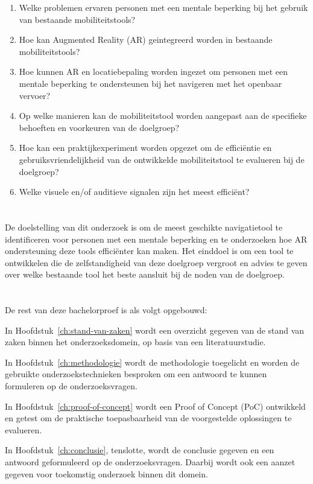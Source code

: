 \begin{enumerate}
    \item Welke problemen ervaren personen met een mentale beperking bij het gebruik van bestaande mobiliteitstools?
    \item Hoe kan Augmented Reality (AR) geintegreerd worden in bestaande mobiliteitstools?
    \item Hoe kunnen AR en locatiebepaling worden ingezet om personen met een mentale beperking te ondersteunen bij het navigeren met het openbaar vervoer?
    \item Op welke manieren kan de mobiliteitstool worden aangepast aan de specifieke behoeften en voorkeuren van de doelgroep?
    \item Hoe kan een praktijkexperiment worden opgezet om de efficiëntie en gebruiksvriendelijkheid van de ontwikkelde mobiliteitstool te evalueren bij de doelgroep?
    \item Welke visuele en/of auditieve signalen zijn het meest efficiënt? %
\end{enumerate}

\section{}%
\label{sec:onderzoeksdoelstelling}

De doelstelling van dit onderzoek is om de meest geschikte navigatietool te identificeren voor personen met een mentale beperking en te onderzoeken hoe AR ondersteuning deze tools efficiënter kan maken. Het einddoel is om een tool te ontwikkelen die de zelfstandigheid van deze doelgroep vergroot en advies te geven over welke bestaande tool het beste aansluit bij de noden van de doelgroep.

\section{}%
\label{sec:opzet-bachelorproef}

De rest van deze bachelorproef is als volgt opgebouwd:

In Hoofdstuk~\ref{ch:stand-van-zaken} wordt een overzicht gegeven van de stand van zaken binnen het onderzoeksdomein, op basis van een literatuurstudie.

In Hoofdstuk~\ref{ch:methodologie} wordt de methodologie toegelicht en worden de gebruikte onderzoekstechnieken besproken om een antwoord te kunnen formuleren op de onderzoeksvragen.

In Hoofdstuk~\ref{ch:proof-of-concept} wordt een Proof of Concept (PoC) ontwikkeld en getest om de praktische toepasbaarheid van de voorgestelde oplossingen te evalueren.

In Hoofdstuk~\ref{ch:conclusie}, tenslotte, wordt de conclusie gegeven en een antwoord geformuleerd op de onderzoeksvragen. Daarbij wordt ook een aanzet gegeven voor toekomstig onderzoek binnen dit domein.
